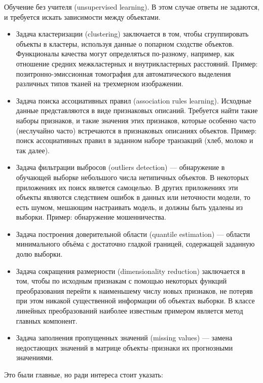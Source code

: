 \documentclass[a4paper, 12pt]{article}
\begin{document}
	Обучение без учителя (unsupervised learning). В этом случае ответы не задаются, и требуется искать зависимости между объектами.
	\begin{itemize}
	\item Задача кластеризации (clustering) заключается в том, чтобы сгруппировать объекты в кластеры, используя данные о попарном сходстве объектов. Функционалы качества могут определяться по-разному, например, как отношение средних межкластерных и внутрикластерных расстояний. Пример: позитронно-эмиссионная томография для автоматического выделения различных типов тканей на трехмерном изображении.
	
	\item Задача поиска ассоциативных правил (association rules learning). Исходные данные представляются в виде признаковых описаний. Требуется найти такие наборы признаков, и такие значения этих признаков, которые особенно часто (неслучайно часто) встречаются в признаковых описаниях объектов. Пример: поиск ассоциативных правил в заданном наборе транзакций (хлеб, молоко и так далее).
	
	\item Задача фильтрации выбросов (outliers detection) — обнаружение в обучающей выборке небольшого числа нетипичных объектов. В некоторых приложениях их поиск является самоцелью. В других приложениях эти объекты являются следствием ошибок в данных или неточности модели, то есть шумом, мешающим настраивать модель, и должны быть удалены из выборки. Пример: обнаружение мошенничества.
	
	\item Задача построения доверительной области (quantile estimation) — области минимального объёма с достаточно гладкой границей, содержащей заданную долю выборки.
	
	\item Задача сокращения размерности (dimensionality reduction) заключается в том, чтобы по исходным признакам с помощью некоторых функций преобразования перейти к наименьшему числу новых признаков, не потеряв при этом никакой существенной информации об объектах выборки. В классе линейных преобразований наиболее известным примером является метод главных компонент.
	
	\item Задача заполнения пропущенных значений (missing values) — замена недостающих значений в матрице объекты–признаки их прогнозными значениями.
	\end{itemize}

	Это были главные, но ради интереса стоит указать:
	
\end{document}
